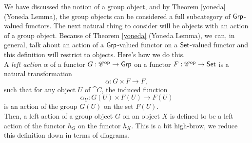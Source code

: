 \begin{discussion}
We have discussed the notion of a group object, and by Theorem \ref{yoneda} (Yoneda Lemma), the group objects can be considered a full subcategory of $\mathsf{Grp}$-valued functors. The next natural thing to consider will be objects with an action of a group object. Because of Theorem \ref{yoneda} (Yoneda Lemma), we can, in general, talk about an action of a $\mathsf{Grp}$-valued functor on a $\mathsf{Set}$-valued functor and this definition will restrict to objects. Here's how we do this.\\[1em]
A \emph{left action} $\alpha$ of a functor $G: \mathscr{C}^{\text{op}} \to \mathsf{Grp}$ on a functor $F: \mathscr{C}^{\text{op}} \to \mathsf{Set}$ is a natural transformation 
\[\alpha:G \times F \to F,\] such that for any object $U$ of $\cat{C}$, the induced function \[\alpha_U:G(U) \times F(U) \to F(U)\] is an action of the group $G(U)$ on the set $F(U)$.\\[1em]
Then, a left action of a group object $G$ on an object $X$ is defined to be a left action of the functor $h_G$ on the functor $h_X$. This is a bit high-brow, we reduce this definition down in terms of diagrams. 
\end{discussion}

\vspace*{0.1in}

